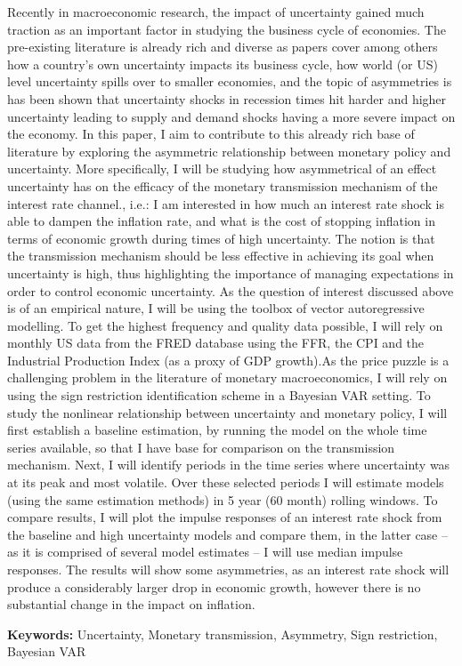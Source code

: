 \documentclass[12pt,a4paper]{article}
\begin{document}
Recently in macroeconomic research, the impact of uncertainty gained much traction as an important factor in studying the business cycle of economies. The pre-existing literature is already rich and diverse as papers cover among others how a country’s own uncertainty impacts its business cycle, how world (or US) level uncertainty spills over to smaller economies, and the topic of asymmetries is has been shown that uncertainty shocks in recession times hit harder and higher uncertainty leading to supply and demand shocks having a more severe impact on the economy. In this paper, I aim to contribute to this already rich base of literature by exploring the asymmetric relationship between monetary policy and uncertainty. More specifically, I will be studying how asymmetrical of an effect uncertainty has on the efficacy of the monetary transmission mechanism of the interest rate channel., i.e.: I am interested in how much an interest rate shock is able to dampen the inflation rate, and what is the cost of stopping inflation in terms of economic growth during times of high uncertainty. The notion is that the transmission mechanism should be less effective in achieving its goal when uncertainty is high, thus highlighting the importance of managing expectations in order to control economic uncertainty. 
As the question of interest discussed above is of an empirical nature, I will be using the toolbox of vector autoregressive modelling. To get the highest frequency and quality data possible, I will rely on monthly US data from the FRED database using the FFR, the CPI and the Industrial Production Index (as a proxy of GDP growth).As the price puzzle is a challenging problem in the literature of monetary macroeconomics, I will rely on using the sign restriction identification scheme in a Bayesian VAR setting. To study the nonlinear relationship between uncertainty and monetary policy, I will first establish a baseline estimation, by running the model on the whole time series available, so that I have base for comparison on the transmission mechanism. Next, I will identify periods in the time series where uncertainty was at its peak and most volatile. Over these selected periods I will estimate models (using the same estimation methods) in 5 year (60 month) rolling windows. To compare results, I will plot the impulse responses of an interest rate shock from the baseline and high uncertainty models and compare them, in the latter case – as it is comprised of several model estimates – I will use median impulse responses. The results will show some asymmetries, as an interest rate shock will produce a considerably larger drop in economic growth, however there is no substantial change in the impact on inflation.\\

\bigskip

\noindent \textbf{Keywords:} Uncertainty, Monetary transmission, Asymmetry, Sign restriction, Bayesian VAR


	\pagebreak
	

	
	
\end{document}
